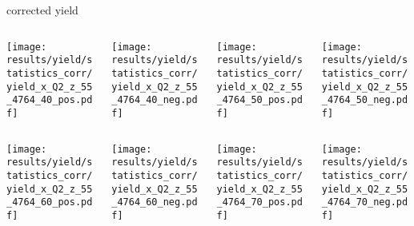 \begin{frame}{corrected yield}
\begin{columns}
\begin{column}[T]{0.25\textwidth}
\texttt{[image: results/yield/statistics\_corr/yield\_x\_Q2\_z\_55\_4764\_40\_pos.pdf]}
\end{column}
\begin{column}[T]{0.25\textwidth}
\texttt{[image: results/yield/statistics\_corr/yield\_x\_Q2\_z\_55\_4764\_40\_neg.pdf]}
\end{column}
\begin{column}[T]{0.25\textwidth}
\texttt{[image: results/yield/statistics\_corr/yield\_x\_Q2\_z\_55\_4764\_50\_pos.pdf]}
\end{column}
\begin{column}[T]{0.25\textwidth}
\texttt{[image: results/yield/statistics\_corr/yield\_x\_Q2\_z\_55\_4764\_50\_neg.pdf]}
\end{column}
\end{columns}
\begin{columns}
\begin{column}[T]{0.25\textwidth}
\texttt{[image: results/yield/statistics\_corr/yield\_x\_Q2\_z\_55\_4764\_60\_pos.pdf]}
\end{column}
\begin{column}[T]{0.25\textwidth}
\texttt{[image: results/yield/statistics\_corr/yield\_x\_Q2\_z\_55\_4764\_60\_neg.pdf]}
\end{column}
\begin{column}[T]{0.25\textwidth}
\texttt{[image: results/yield/statistics\_corr/yield\_x\_Q2\_z\_55\_4764\_70\_pos.pdf]}
\end{column}
\begin{column}[T]{0.25\textwidth}
\texttt{[image: results/yield/statistics\_corr/yield\_x\_Q2\_z\_55\_4764\_70\_neg.pdf]}
\end{column}
\end{columns}
\end{frame}
